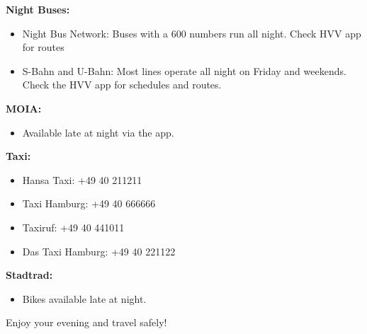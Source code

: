 \vspace*{0.5cm}
\textbf{Night Buses:}
\begin{itemize}
	\item Night Bus Network: Buses with a 600 numbers run all night. Check HVV app for routes 
	\item S-Bahn and U-Bahn: Most lines operate all night on Friday and weekends. Check the HVV app for schedules and routes.
	
\end{itemize}

\vspace*{0.5cm}
\textbf{MOIA:}
\begin{itemize}
	\item Available late at night via the app.
\end{itemize}

\vspace*{0.5cm}
\textbf{Taxi:}
\begin{itemize}
	\item Hansa Taxi: +49 40 211211
	\item Taxi Hamburg: +49 40 666666
	\item Taxiruf: +49 40 441011
	\item Das Taxi Hamburg: +49 40 221122
	
\end{itemize}

\vspace*{0.5cm}
\textbf{Stadtrad:}
\begin{itemize}
	\item Bikes available late at night.
\end{itemize}

\vspace*{1cm}

\begin{center}
	Enjoy your evening and travel safely!
\end{center}

